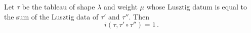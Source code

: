 \documentclass[draft]{article}
\begin{document}
\begin{conjecture}
    Let $\tau$ be the tableau of shape $\lambda$ and weight $\mu$ whose Lusztig datum is equal to the sum of the Lusztig data of $\tau'$ and $\tau''$. 
    Then 
    \begin{equation}
        i(\tau, 
        \tau' \circ \tau''
        ) = 1 \,. 
    \end{equation}
\end{conjecture}
% 
\end{document}
